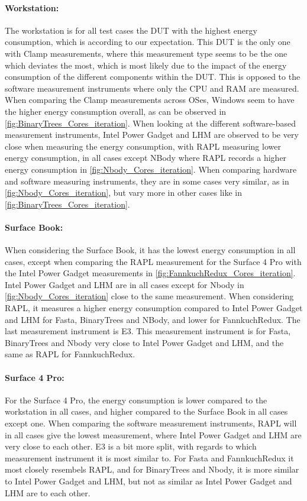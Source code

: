 \paragraph{Workstation:} The workstation is for all test cases the DUT with the highest energy consumption, which is according to our expectation. This DUT is the only one with Clamp measurements, where this measurement type seems to be the one which deviates the most, which is most likely due to the impact of the energy consumption of the different components within the DUT. This is opposed to the software measurement instruments where only the CPU and RAM are measured. When comparing the Clamp measurements across OSes, Windows seem to have the higher energy consumption overall, as can be observed in \cref{fig:BinaryTrees_Cores_iteration}. When looking at the different software-based measurement instruments, Intel Power Gadget and LHM are observed to be very close when measuring the energy consumption, with RAPL measuring lower energy consumption, in all cases except NBody where RAPL records a higher energy consumption in \cref{fig:Nbody_Cores_iteration}. When comparing hardware and software measuring instruments, they are in some cases very similar, as in \cref{fig:Nbody_Cores_iteration}, but vary more in other cases like in \cref{fig:BinaryTrees_Cores_iteration}.

\paragraph{Surface Book:} When considering the Surface Book, it has the lowest energy consumption in all cases, except when comparing the RAPL measurement for the Surface 4 Pro with the Intel Power Gadget measurements in \cref{fig:FannkuchRedux_Cores_iteration}. Intel Power Gadget and LHM are in all cases except for Nbody in \cref{fig:Nbody_Cores_iteration} close to the same measurement. When considering RAPL, it measures a higher energy consumption compared to Intel Power Gadget and LHM for Fasta, BinaryTrees and NBody, and lower for FannkuchRedux. The last measurement instrument is E3. This measurement instrument is for Fasta, BinaryTrees and Nbody very close to Intel Power Gadget and LHM, and the same as RAPL for FannkuchRedux.

\paragraph{Surface 4 Pro:} For the Surface 4 Pro, the energy consumption is lower compared to the workstation in all cases, and higher compared to the Surface Book in all cases except one. When comparing the software measurement instruments, RAPL will in all cases give the lowest measurement, where Intel Power Gadget and LHM are very close to each other. E3 is a bit more split, with regards to which measurement instrument it is most similar to. For Fasta and FannkuchRedux it most closely resembels RAPL, and for BinaryTrees and Nbody, it is more similar to Intel Power Gadget and LHM, but not as similar as Intel Power Gadget and LHM are to each other.



